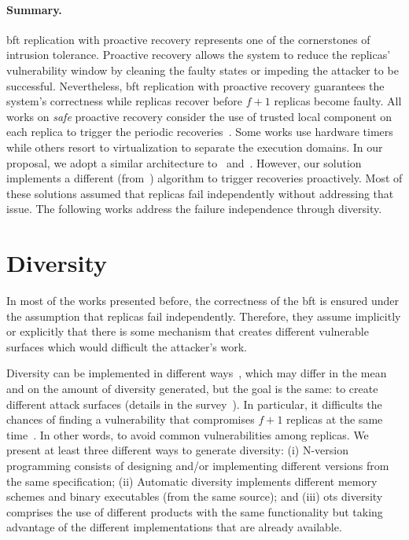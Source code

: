 \paragraph{Summary.} 
\gls{bft} replication with proactive recovery represents one of the cornerstones of intrusion tolerance. 
Proactive recovery allows the system to reduce the replicas' vulnerability window by cleaning the faulty states or impeding the attacker to be successful. 
Nevertheless, \gls{bft} replication with proactive recovery guarantees the system's correctness while replicas recover before $f+1$ replicas become faulty. 
All works on \emph{safe} proactive recovery consider the use of trusted local component on each replica to trigger the periodic recoveries~\cite{Castro:2002,Sousa:2010,Roeder:2010,Platania:2014,Distler:2011}.
Some works use hardware timers while others resort to virtualization to separate the execution domains. 
In our proposal, we adopt a similar architecture to~\cite{Distler:2008} and~\cite{Sousa:2010}. 
However, our solution implements a different (from~\cite{Sousa:2010}) algorithm to trigger recoveries proactively.
Most of these solutions assumed that replicas fail independently without addressing that issue. 
The following works address the failure independence through diversity. 




\section{Diversity}
In most of the works presented before, the correctness of the \gls{bft} is ensured under the assumption that replicas fail independently.
Therefore, they assume implicitly or explicitly that there is some mechanism that creates different vulnerable surfaces which would difficult the attacker's work.

Diversity can be implemented in different ways~\cite{Deswarte:1998,Larsen:2015}, which may differ in the mean and on the amount of diversity generated, but the goal is the same: to create different attack surfaces (details in the survey~\cite{Baudry:2015}).
In particular, it difficults the chances of finding a vulnerability that compromises $f+1$ replicas at the same time~\cite{Castro:2002}.
In other words, to avoid common vulnerabilities among replicas. 
We present at least three different ways to generate diversity: 
(i) N-version programming consists of designing and/or implementing  different versions from the same specification; 
(ii) Automatic diversity implements different memory schemes and binary executables (from the same source); 
and (iii) \gls{ots} diversity comprises the use of different products with the same functionality but taking advantage of the different implementations that are already available.


